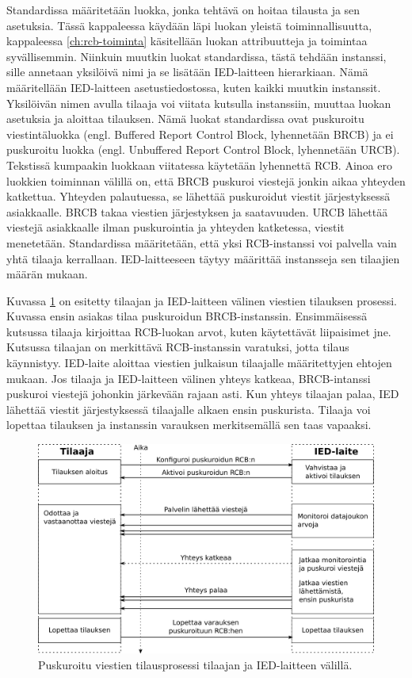 Standardissa määritetään luokka, jonka tehtävä on hoitaa tilausta ja sen asetuksia. Tässä kappaleessa käydään läpi luokan yleistä toiminnallisuutta, kappaleessa \ref{ch:rcb-toiminta} käsitellään luokan attribuutteja ja toimintaa syvällisemmin. Niinkuin muutkin luokat standardissa, tästä tehdään instanssi, sille annetaan yksilöivä nimi ja se lisätään IED-laitteen hierarkiaan. Nämä määritellään IED-laitteen asetustiedostossa, kuten kaikki muutkin instanssit. Yksilöivän nimen avulla tilaaja voi viitata kutsulla instanssiin, muuttaa luokan asetuksia ja aloittaa tilauksen. Nämä luokat standardissa ovat puskuroitu viestintäluokka (engl. Buffered Report Control Block, lyhennetään BRCB) ja ei puskuroitu luokka (engl. Unbuffered Report Control Block, lyhennetään URCB). Tekstissä kumpaakin luokkaan viitatessa käytetään lyhennettä RCB. Ainoa ero luokkien toiminnan välillä on, että BRCB puskuroi viestejä jonkin aikaa yhteyden katkettua. Yhteyden palautuessa, se lähettää puskuroidut viestit järjestyksessä asiakkaalle. BRCB takaa viestien järjestyksen ja saatavuuden. URCB lähettää viestejä asiakkaalle ilman puskurointia ja yhteyden katketessa, viestit menetetään. Standardissa määritetään, että yksi RCB-instanssi voi palvella vain yhtä tilaaja kerrallaan. IED-laitteeseen täytyy määrittää instansseja sen tilaajien määrän mukaan.

Kuvassa \ref{fig:iec61850-brcb-communication} on esitetty tilaajan ja IED-laitteen välinen viestien tilauksen prosessi. Kuvassa ensin asiakas tilaa puskuroidun BRCB-instanssin. Ensimmäisessä kutsussa tilaaja kirjoittaa RCB-luokan arvot, kuten käytettävät liipaisimet jne. Kutsussa tilaajan on merkittävä RCB-instanssin varatuksi, jotta tilaus käynnistyy. IED-laite aloittaa viestien julkaisun tilaajalle määritettyjen ehtojen mukaan. Jos tilaaja ja IED-laitteen välinen yhteys katkeaa, BRCB-intanssi puskuroi viestejä johonkin järkevään rajaan asti. Kun yhteys tilaajan palaa, IED lähettää viestit järjestyksessä tilaajalle alkaen ensin puskurista. Tilaaja voi lopettaa tilauksen ja instanssin varauksen merkitsemällä sen taas vapaaksi.

\begin{figure}[ht!]
	\includegraphics[width=1\textwidth]{pictures/iec61850-brcb-communication.png}
	\caption{Puskuroitu viestien tilausprosessi tilaajan ja IED-laitteen välillä.}
	\label{fig:iec61850-brcb-communication}
\end{figure}

